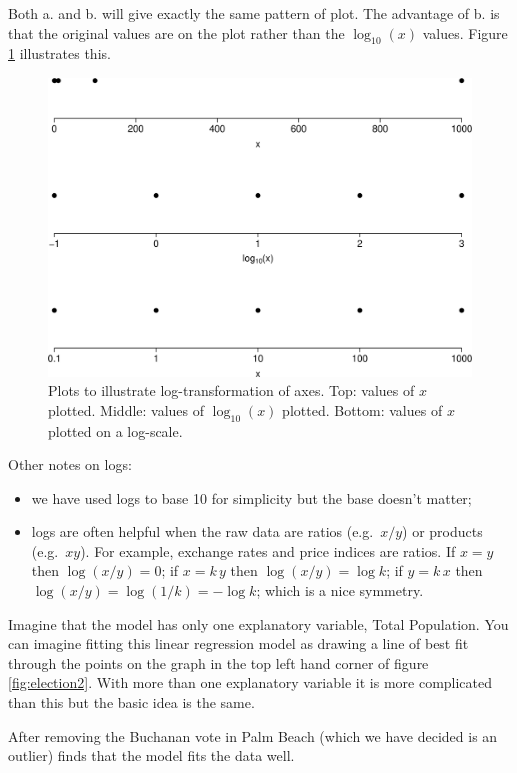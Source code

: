 \documentclass[
  11pt,
  british,
  openany, a4paper]{book}
\providecommand{\tightlist}{%
  \setlength{\itemsep}{0pt}\setlength{\parskip}{0pt}}
\begin{document}
Both a. and b. will give exactly the same pattern of plot. The advantage of b. is that the original values are on the plot rather than the \(\log_{10}(x)\)
values. Figure \ref{fig:logaxes} illustrates this.

\begin{figure}

{\centering \includegraphics[width=0.75\linewidth]{images/log_axes} 

}

\caption{Plots to illustrate log-transformation of axes. Top: values of $x$ plotted. Middle: values of $\log_{10}(x)$ plotted. Bottom: values of $x$ plotted on a log-scale.}\label{fig:logaxes}
\end{figure}

Other notes on logs:

\begin{itemize}
\tightlist
\item
  we have used logs to base 10 for simplicity but the base doesn't matter;
\item
  logs are often helpful when the raw data are ratios (e.g.~\(x/y\)) or products (e.g.~\(xy\)). For example, exchange rates and price indices are ratios. If \(x=y\) then \(\log (x/y)=0\); if \(x=k\,y\) then \(\log (x/y)=\log k\); if \(y=k\,x\) then \(\log (x/y)=\log(1/k)=-\log k\); which is a nice symmetry.
\end{itemize}

Imagine that the model has only one explanatory variable, Total Population. You can imagine fitting this linear regression model as drawing a line of best fit through the points on the graph in the top left hand corner of figure \ref{fig:election2}. With more than one explanatory variable it is more complicated than this but the basic idea is the same.

After removing the Buchanan vote in Palm Beach (which we have decided is an outlier) \citet{election} finds that the model fits the data well.
\end{document}

